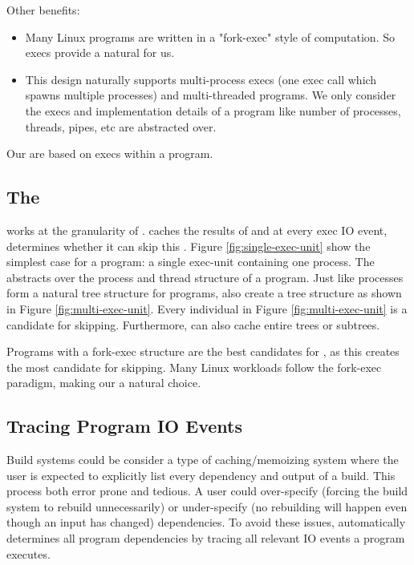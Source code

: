 Other benefits:
\begin{itemize}
  \item Many Linux programs are written in a "fork-exec" style of computation. So execs provide a natural
  \cacheunit for us.
  \item This design naturally supports multi-process execs (one exec call which spawns multiple processes) and multi-threaded programs. We only consider the execs and implementation details of a program like number of processes, threads, pipes, etc are abstracted over.
\end{itemize}

Our \cacheunit are based on execs within a program.


\subsection{The \cacheunit}
\pc works at the granularity of \cacheunit. \pc caches the results of \cacheunit and at every exec
IO event, determines whether it can skip this \cacheunit. Figure \ref{fig:single-exec-unit} show the simplest
case for a program: a single exec-unit containing one process. The \cacheunit abstracts over the process and
thread structure of a program. Just like processes form a natural tree structure for programs, \cacheunit also
create a tree structure as shown in Figure \ref{fig:multi-exec-unit}. Every individual \cacheunit in Figure \ref{fig:multi-exec-unit} is a candidate for skipping. Furthermore, \pc can also cache entire \cacheunit
trees or subtrees.

Programs with a fork-exec structure are the best candidates for \pc, as this creates the most candidate \cacheunit for skipping. Many Linux workloads follow the fork-exec paradigm, making our \cacheunit a natural choice.

\subsection{Tracing Program IO Events}
Build systems could be consider a type of caching/memoizing system where the user is expected to explicitly list every dependency and output of a build. This process both error prone and tedious. A user could over-specify (forcing the build system to rebuild unnecessarily) or under-specify (no rebuilding will happen even though an input has changed) dependencies. To avoid these issues, \pc automatically determines all program dependencies by tracing all relevant IO events a program executes.


